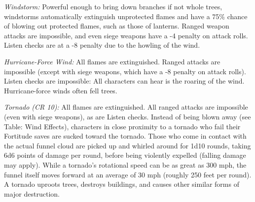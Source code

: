 \textit{Windstorm:} Powerful enough to bring down branches if not whole trees, 
windstorms automatically extinguish unprotected flames and have a 75\% chance of 
blowing out protected flames, such as those of lanterns. Ranged weapon attacks 
are impossible, and even siege weapons have a -4 penalty on attack rolls. Listen 
checks are at a -8 penalty due to the howling of the wind. 

\textit{Hurricane-Force Wind:} All flames are extinguished. Ranged attacks are 
impossible (except with siege weapons, which have a -8 penalty on attack rolls). 
Listen checks are impossible: All characters can hear is the roaring of the wind. 
Hurricane-force winds often fell trees.

\textit{Tornado (CR 10):} All flames are extinguished. All ranged attacks are impossible 
(even with siege weapons), as are Listen checks. Instead of being blown away (see 
Table: Wind Effects), characters in close proximity to a tornado who fail their 
Fortitude saves are sucked toward the tornado. Those who come in contact with the 
actual funnel cloud are picked up and whirled around for 1d10 rounds, taking 6d6 
points of damage per round, before being violently expelled (falling damage may 
apply). While a tornado's rotational speed can be as great as 300 mph, the funnel 
itself moves forward at an average of 30 mph (roughly 250 feet per round). A tornado 
uproots trees, destroys buildings, and causes other similar forms of major destruction.

